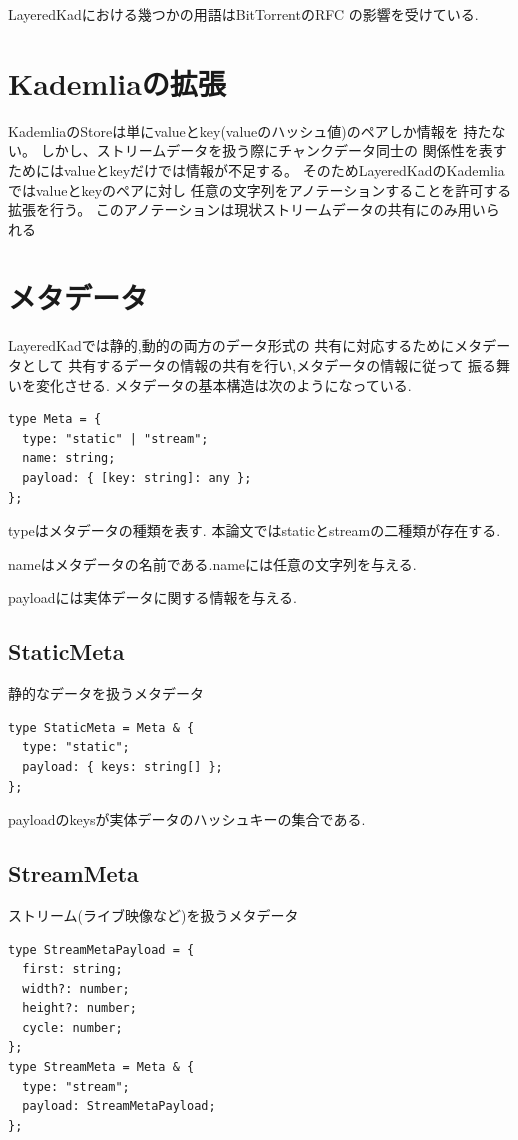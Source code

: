 \documentclass[sotsuron]{jcsie}
\begin{document}
LayeredKadにおける幾つかの用語はBitTorrentのRFC\cite{bep0000r38:online}
の影響を受けている.

\section{Kademliaの拡張}
KademliaのStoreは単にvalueとkey(valueのハッシュ値)のペアしか情報を
持たない。
しかし、ストリームデータを扱う際にチャンクデータ同士の
関係性を表すためにはvalueとkeyだけでは情報が不足する。
そのためLayeredKadのKademliaではvalueとkeyのペアに対し
任意の文字列をアノテーションすることを許可する拡張を行う。
このアノテーションは現状ストリームデータの共有にのみ用いられる

\section{メタデータ}
LayeredKadでは静的,動的の両方のデータ形式の
共有に対応するためにメタデータとして
共有するデータの情報の共有を行い,メタデータの情報に従って
振る舞いを変化させる.
メタデータの基本構造は次のようになっている.

\begin{lstlisting}
type Meta = {
  type: "static" | "stream";
  name: string;
  payload: { [key: string]: any };
};
\end{lstlisting}

typeはメタデータの種類を表す.
本論文ではstaticとstreamの二種類が存在する.

nameはメタデータの名前である.nameには任意の文字列を与える.

payloadには実体データに関する情報を与える.

\subsection{StaticMeta}
静的なデータを扱うメタデータ
\begin{lstlisting}
type StaticMeta = Meta & {
  type: "static";
  payload: { keys: string[] };
};
\end{lstlisting}

payloadのkeysが実体データのハッシュキーの集合である.

\subsection{StreamMeta}
ストリーム(ライブ映像など)を扱うメタデータ
\begin{lstlisting}
type StreamMetaPayload = {
  first: string;
  width?: number;
  height?: number;
  cycle: number;
};	
type StreamMeta = Meta & {
  type: "stream";
  payload: StreamMetaPayload;
};  
\end{lstlisting}
\end{document}
